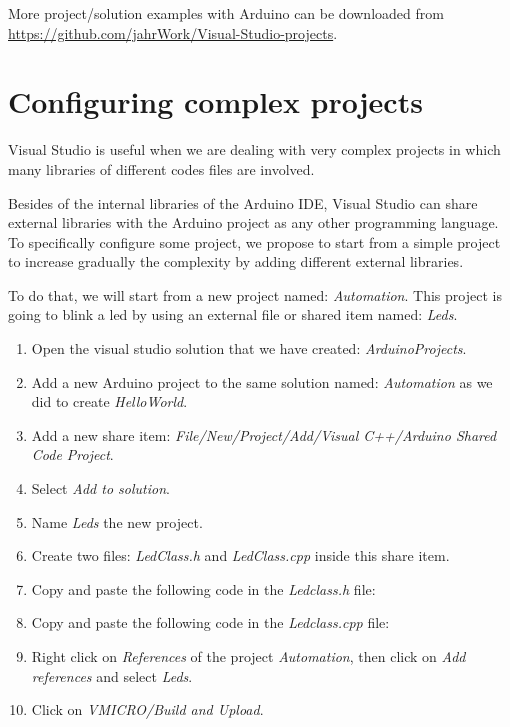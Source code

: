 \begin{IN}
    More project/solution examples with Arduino can be downloaded from \url{https://github.com/jahrWork/Visual-Studio-projects}.
\end{IN}

    \section{Configuring complex projects}
    
Visual Studio is useful when we  are dealing with very complex projects in which many libraries of different codes files are involved. 
	
Besides of the internal libraries of the Arduino IDE, Visual Studio can share external libraries with the Arduino project as any other programming language. 
To specifically configure some project, we propose to start from a simple project to increase gradually the complexity by adding different external libraries. 	

To do that, we will start from a new project named: \textit{Automation}. This project is going to blink a led by using an external file or shared item named: \textit{Leds}. 

\newpage
\begin{enumerate} 
	\item Open the visual studio solution that we have created: \textit{ArduinoProjects}. 
	\item Add a new Arduino project to the same solution named: \textit{Automation} as we did to create \textit{HelloWorld}.  
	\item Add a new share item:
	 \textit{File/New/Project/Add/Visual C++/Arduino Shared Code Project}.
	\item Select \textit{Add to solution}.
	\item Name \textit{Leds} the new project. 
	\item Create two files: \textit{LedClass.h} and \textit{LedClass.cpp} inside this share item. 
	\item Copy and paste the following code in the \textit{Ledclass.h} file: 
	
	
	
	\item Copy and paste the following code in the  \textit{Ledclass.cpp} file: 
	
	
	
	\item Right click on \textit{References} of the project \textit{Automation}, then click on \textit{Add references} and select \textit{Leds}.
	
    \item Click on \textit{VMICRO/Build and Upload}.
\end{enumerate} 

